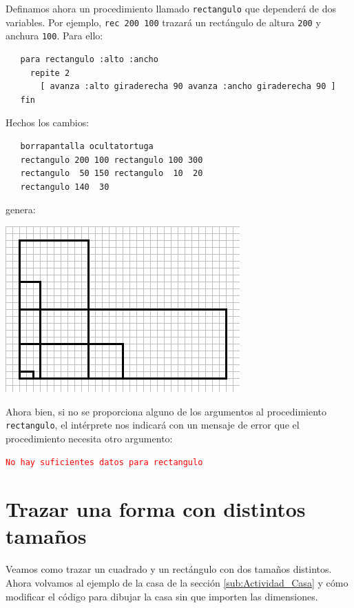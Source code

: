 \documentclass[12pt,twoside,spanish,a4paper]{report}
\begin{document}
Definamos ahora un procedimiento llamado \texttt{rectangulo} que depender\'a
de dos variables. Por ejemplo, \texttt{rec 200 100} trazar\'a un rect\'angulo
de altura \texttt{200} y anchura \texttt{100}. Para ello:
\begin{verbatim}
   para rectangulo :alto :ancho
     repite 2
       [ avanza :alto giraderecha 90 avanza :ancho giraderecha 90 ]
   fin \end{verbatim}
Hechos los cambios:
\begin{verbatim}
   borrapantalla ocultatortuga
   rectangulo 200 100 rectangulo 100 300
   rectangulo  50 150 rectangulo  10  20
   rectangulo 140  30 \end{verbatim}
genera:
\begin{center}
   \includegraphics[scale=0.5]{Imagenes_Tutorial/07_rectangulos.png}
\end{center}

Ahora bien, si no se proporciona alguno de los argumentos al procedimiento
\texttt{rectangulo}, el int\'erprete nos indicar\'a con un mensaje de error que
el procedimiento necesita otro argumento:

\textcolor{red}{\texttt{No hay suficientes datos para  rectangulo}}

\section{Trazar una forma con distintos tama\~nos}
   \label{sub:Trazar-forma}

Veamos como trazar un cuadrado y un rect\'angulo con dos tama\~nos distintos.
Ahora volvamos al ejemplo de la casa de la secci\'on \ref{sub:Actividad_Casa}
y c\'omo modificar el c\'odigo para dibujar la casa sin que importen las
dimensiones.
\end{document}
